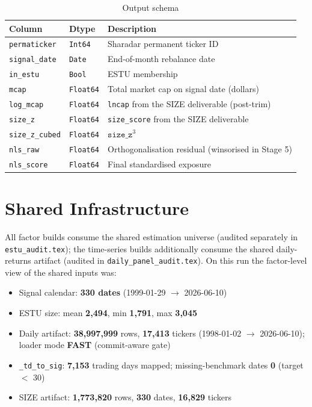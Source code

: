 \documentclass[11pt,a4paper]{article}
\begin{document}
\begin{table}[h!]
\centering
\caption{Output schema}
\begin{tabular}{llp{7.4cm}}
\toprule
\textbf{Column} & \textbf{Dtype} & \textbf{Description} \\
\midrule
\texttt{permaticker} & \texttt{Int64} & Sharadar permanent ticker ID \\
\texttt{signal\_date} & \texttt{Date} & End-of-month rebalance date \\
\texttt{in\_estu} & \texttt{Bool} & ESTU membership \\
\texttt{mcap} & \texttt{Float64} & Total market cap on signal date (dollars) \\
\texttt{log\_mcap} & \texttt{Float64} & \texttt{lncap} from the SIZE deliverable (post-trim) \\
\texttt{size\_z} & \texttt{Float64} & \texttt{size\_score} from the SIZE deliverable \\
\texttt{size\_z\_cubed} & \texttt{Float64} & $\texttt{size\_z}^{3}$ \\
\texttt{nls\_raw} & \texttt{Float64} & Orthogonalisation residual (winsorised in Stage 5) \\
\texttt{nls\_score} & \texttt{Float64} & Final standardised exposure \\
\bottomrule
\end{tabular}
\end{table}

\section{Shared Infrastructure}

All factor builds consume the shared estimation universe
 (audited separately in
\texttt{estu\_audit.tex}); the time-series builds additionally consume the
shared daily-returns artifact (audited in \texttt{daily\_panel\_audit.tex}).
On this run the factor-level view of the shared inputs was:

\begin{itemize}[leftmargin=*,topsep=2pt,itemsep=2pt]
  \item Signal calendar: \textbf{330 dates} (1999-01-29 $\to$ 2026-06-10)
  \item ESTU size: mean \textbf{2{,}494}, min \textbf{1{,}791}, max \textbf{3{,}045}
  \item Daily artifact: \textbf{38{,}997{,}999} rows, \textbf{17{,}413} tickers (1998-01-02 $\to$ 2026-06-10); loader mode \textbf{FAST} (commit-aware gate)
  \item \texttt{\_td\_to\_sig}: \textbf{7{,}153} trading days mapped; missing-benchmark dates \textbf{0} (target $<$ 30)
  \item SIZE artifact: \textbf{1{,}773{,}820} rows, \textbf{330} dates, \textbf{16{,}829} tickers
\end{itemize}
\end{document}
